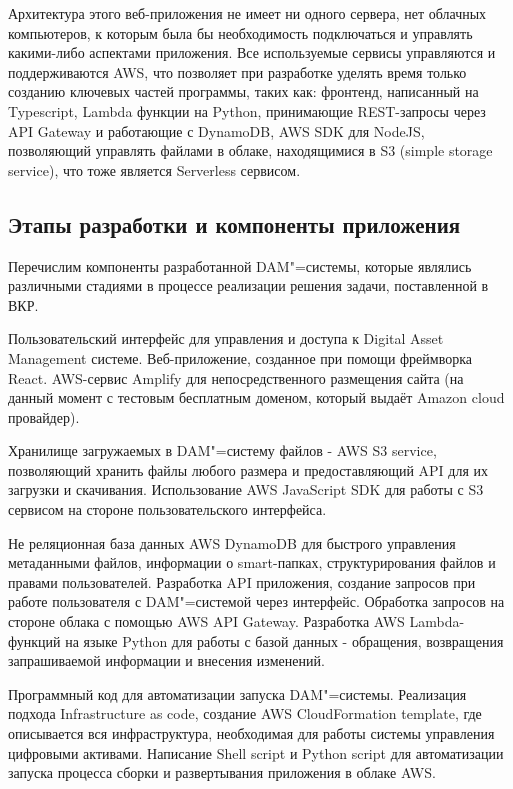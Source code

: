 Архитектура этого веб-приложения не имеет ни одного сервера, нет облачных компьютеров, к которым была бы необходимость подключаться и управлять какими-либо аспектами приложения. Все используемые сервисы управляются и поддерживаются AWS, что позволяет при разработке уделять время только созданию ключевых частей программы, таких как: фронтенд, написанный на Typescript, Lambda функции на Python, принимающие REST-запросы через API Gateway и работающие с DynamoDB, AWS SDK для NodeJS, позволяющий управлять файлами в облаке, находящимися в S3 (simple storage service), что тоже является Serverless сервисом.

\subsection{Этапы разработки и компоненты приложения} 

Перечислим компоненты разработанной DAM"=системы, которые являлись различными стадиями в процессе реализации решения задачи, поставленной в ВКР.

Пользовательский интерфейс для управления и доступа к Digital Asset Management системе. Веб-приложение, созданное при помощи фреймворка React. AWS-сервис Amplify для непосредственного размещения сайта (на данный момент с тестовым бесплатным доменом, который выдаёт Amazon cloud провайдер).

Хранилище загружаемых в DAM"=систему файлов - AWS S3 service, позволяющий хранить файлы любого размера и предоставляющий API для их загрузки и скачивания. Использование AWS JavaScript SDK для работы с S3 сервисом на стороне пользовательского интерфейса.

Не реляционная база данных AWS DynamoDB для быстрого управления метаданными файлов, информации о smart-папках, структурирования файлов и правами пользователей. Разработка API приложения, создание запросов при работе пользователя с DAM"=системой через интерфейс. Обработка запросов на стороне облака с помощью AWS API Gateway. Разработка AWS Lambda-функций на языке Python для работы с базой данных - обращения, возвращения запрашиваемой информации и внесения изменений.

Программный код для автоматизации запуска DAM"=системы. Реализация подхода Infrastructure as code, создание AWS CloudFormation template, где описывается вся инфраструктура, необходимая для работы системы управления цифровыми активами. Написание Shell script и Python script для автоматизации запуска процесса сборки и развертывания приложения в облаке AWS.

